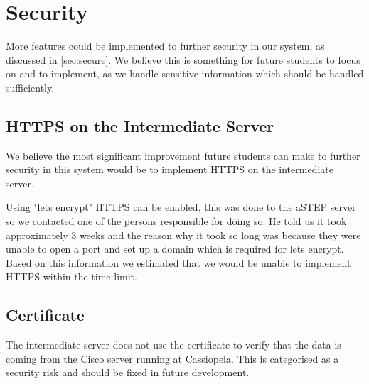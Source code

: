 \section{Security}\label{sec:fucture_secure}
More features could be implemented to further security in our system, as discussed in \cref{sec:secure}. We believe this is something for future students to focus on and to implement, as we handle sensitive information which should be handled sufficiently.

\subsection*{HTTPS on the Intermediate Server}
We believe the most significant improvement future students can make to further security in this system would be to implement HTTPS on the intermediate server.

Using "lets encrypt" HTTPS can be enabled, this was done to the aSTEP server so we contacted one of the persons responsible for doing so. He told us it took approximately 3 weeks and the reason why it took so long was because they were unable to open a port and set up a domain which is required for lets encrypt. 
Based on this information we estimated that we would be unable to implement HTTPS within the time limit.

\subsection*{Certificate}
The intermediate server does not use the certificate to verify that the data is coming from the Cisco server running at Cassiopeia. This is categorised as a security risk and should be fixed in future development.